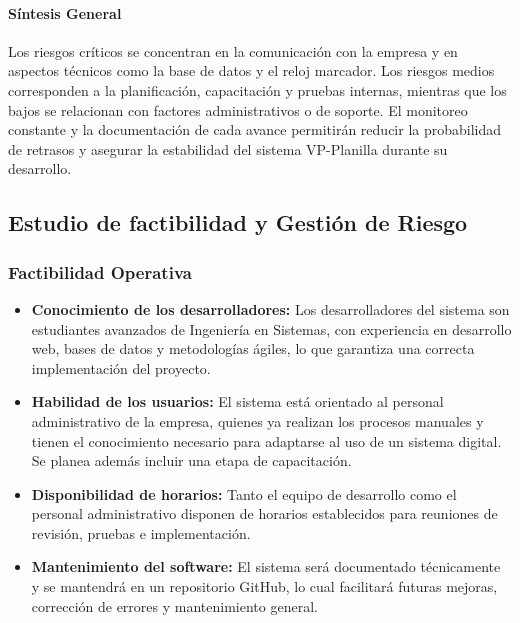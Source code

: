 \paragraph{Síntesis General}
Los riesgos críticos se concentran en la comunicación con la empresa y en aspectos técnicos como la base de datos y el reloj marcador.
Los riesgos medios corresponden a la planificación, capacitación y pruebas internas, mientras que los bajos se relacionan con factores administrativos o de soporte.
El monitoreo constante y la documentación de cada avance permitirán reducir la probabilidad de retrasos y asegurar la estabilidad del sistema VP-Planilla durante su desarrollo.


\newpage
\subsection{Estudio de factibilidad y Gestión de Riesgo}

\subsubsection{Factibilidad Operativa}

\begin{itemize}
	\item \textbf{Conocimiento de los desarrolladores:} Los desarrolladores del sistema son estudiantes avanzados de Ingeniería en Sistemas, con experiencia en desarrollo web, bases de datos y metodologías ágiles, lo que garantiza una correcta implementación del proyecto.

	\item \textbf{Habilidad de los usuarios:} El sistema está orientado al personal administrativo de la empresa, quienes ya realizan los procesos manuales y tienen el conocimiento necesario para adaptarse al uso de un sistema digital. Se planea además incluir una etapa de capacitación.

	\item \textbf{Disponibilidad de horarios:} Tanto el equipo de desarrollo como el personal administrativo disponen de horarios establecidos para reuniones de revisión, pruebas e implementación.

	\item \textbf{Mantenimiento del software:} El sistema será documentado técnicamente y se mantendrá en un repositorio GitHub, lo cual facilitará futuras mejoras, corrección de errores y mantenimiento general.
\end{itemize}

